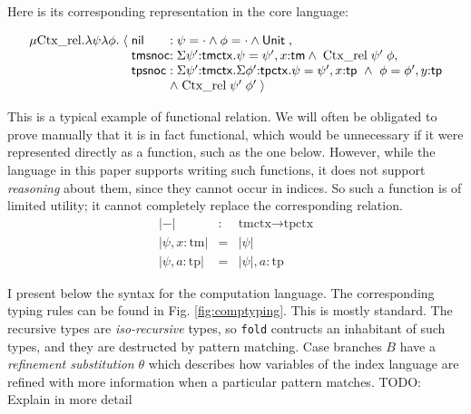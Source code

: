 \documentclass{article}
\newcommand{\LONGVERSION}[1]{{\color{light-gray}#1}}
\begin{document}
Here is its corresponding representation in the core language: 

\[
\begin{array}{r@{\;}c@{\;}l@{}l}
\mu \text{Ctx\_rel}. \lambda \psi\lambda \phi. & \langle & \m{nil}\; &:  \psi
= \cdot \andalso \phi = \cdot \andalso \tunit\;, \\
&  & \m{tmsnoc} & : \Sigma \psi'{:}{\m{tmctx}}. \psi = \psi', x{:}\m{tm}
\andalso\;\text{Ctx\_rel}\;\psi'\;\phi ,\\
&  & \m{tpsnoc} & : \Sigma \psi'{:}{\m{tmctx}}. \Sigma
\phi'{:}{\m{tpctx}}. \psi = \psi', x{:}\m{tp} ~\andalso~ \phi = \phi',
y{:}\m{tp} \\
&&& \andalso\;\text{Ctx\_rel}\;\psi'\;\phi' \;\rangle 
\end{array}
\]

This is a typical example of
functional relation. We will often be obligated to prove manually
that it is in fact functional, which would be unnecessary if it
were represented directly as a function, such as the one
below. However, while the language in this paper supports writing such
functions, it does not support \emph{reasoning} about them, since they
cannot occur in indices. So such a function is of limited
utility; it cannot completely replace the corresponding relation.
\begin{eqnarray*}
|-| & : & \text{tmctx} \rightarrow \text{tpctx} \\
| \psi , x:\text{tm} | & = & | \psi | \\
| \psi , a:\text{tp} | & = & | \psi | , a:\text{tp}
\end{eqnarray*}

I present below the syntax for the computation language. The
corresponding typing rules can be found in Fig. \ref{fig:comptyping}. This
is mostly standard. The recursive types are \emph{iso-recursive}
types, so \lstinline{fold} contructs an inhabitant of such types, and
they are destructed by pattern matching. Case branches $B$ have a
\emph{refinement substitution} $\theta$ which describes how variables
of the index language are refined with more information when a
particular pattern matches. \LONGVERSION{TODO: Explain in more detail}
\end{document}
